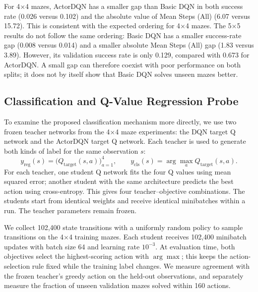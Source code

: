 \documentclass[a4paper,12pt]{article}
\begin{document}
\FloatBarrier
For 4$\times$4 mazes, ActorDQN has a smaller gap than Basic DQN in both success rate (0.026 versus 0.102) and the absolute value of Mean Steps (All) (6.07 versus 15.72). This is consistent with the expected ordering for 4$\times$4 mazes. The 5$\times$5 results do not follow the same ordering: Basic DQN has a smaller success-rate gap (0.008 versus 0.014) and a smaller absolute Mean Steps (All) gap (1.83 versus 3.89). However, its validation success rate is only 0.129, compared with 0.673 for ActorDQN. A small gap can therefore coexist with poor performance on both splits; it does not by itself show that Basic DQN solves unseen mazes better.

\subsection{Classification and Q-Value Regression Probe}

To examine the proposed classification mechanism more directly, we use two frozen teacher networks from the 4$\times$4 maze experiments: the DQN target Q network and the ActorDQN target Q network. Each teacher is used to generate both kinds of label for the same observation $s$:
\begin{equation}
    y_{\mathrm{reg}}(s)=\bigl(Q_{\mathrm{target}}(s,a)\bigr)_{a=1}^{4},
    \qquad
    y_{\mathrm{cls}}(s)=\arg\max_a Q_{\mathrm{target}}(s,a).
\end{equation}
For each teacher, one student Q network fits the four Q values using mean squared error; another student with the same architecture predicts the best action using cross-entropy. This gives four teacher--objective combinations. The students start from identical weights and receive identical minibatches within a run. The teacher parameters remain frozen.

We collect 102,400 state transitions with a uniformly random policy to sample transitions on the 4$\times$4 training mazes. Each student receives 102,400 minibatch updates with batch size 64 and learning rate $10^{-3}$. At evaluation time, both objectives select the highest-scoring action with $\arg\max$; this keeps the action-selection rule fixed while the training label changes. We measure agreement with the frozen teacher's greedy action on the held-out observations, and separately measure the fraction of unseen validation mazes solved within 160 actions. 
\end{document}
